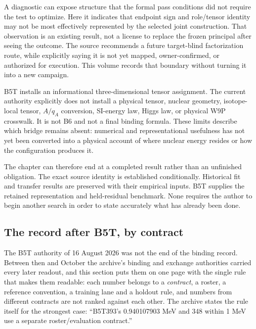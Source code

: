 A diagnostic can expose structure that the formal pass conditions did not require the test to optimize. Here it indicates that endpoint sign and role/tensor identity may not be most effectively represented by the selected joint construction. That observation is an existing result, not a license to replace the frozen principal after seeing the outcome. The source recommends a future target-blind factorization route, while explicitly saying it is not yet mapped, owner-confirmed, or authorized for execution. This volume records that boundary without turning it into a new campaign.

B5T installs an informational three-dimensional tensor assignment. The current authority explicitly does not install a physical tensor, nuclear geometry, isotope-local tensor, $A/q_A$ conversion, SI-energy law, Higgs law, or physical W9P crosswalk. It is not B6 and not a final binding formula. These limits describe which bridge remains absent: numerical and representational usefulness has not yet been converted into a physical account of where nuclear energy resides or how the configuration produces it.

The chapter can therefore end at a completed result rather than an unfinished obligation. The exact source identity is established conditionally. Historical fit and transfer results are preserved with their empirical inputs. B5T supplies the retained representation and held-residual benchmark. None requires the author to begin another search in order to state accurately what has already been done.

\subsection{The record after B5T, by contract}
\label{v2c5:aftertb5t}

The B5T authority of 16 August 2026 was not the end of the binding record. Between then and October the archive's binding and exchange authorities carried every later readout, and this section puts them on one page with the single rule that makes them readable: each number belongs to a \emph{contract}, a roster, a reference convention, a training lane and a holdout rule, and numbers from different contracts are not ranked against each other. The archive states the rule itself for the strongest case: ``B5T393's 0.940107903 MeV and 348 within 1 MeV use a separate roster/evaluation contract.''\cite{viibindinglive,viidcexchange}

